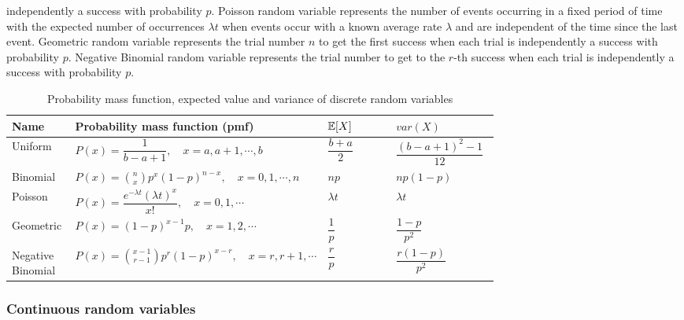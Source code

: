 independently a success with probability \(p\). Poisson random variable represents the number of events occurring in a fixed period of time with the expected number of occurrences \(\lambda t\) when events occur with a known average rate \(\lambda\) and are independent of the time since the last event. Geometric random variable represents the trial number \(n\) to get the first success when each trial is independently a success with probability \(p\). Negative Binomial random variable represents the trial number to get to the \(r\)-th success when each trial is independently a success with probability \(p\).

\begin{table}[H]
\centering
\small
\setlength{\tabcolsep}{3pt}
\begin{tabularx}{\linewidth}{|>{\raggedright\arraybackslash}p{0.13\linewidth}|>{\raggedright\arraybackslash}p{0.45\linewidth}|>{\centering\arraybackslash}p{0.14\linewidth}|>{\centering\arraybackslash}X|}
\hline
Name & Probability mass function (pmf) & \(\mathbb{E}[X]\) & \(\mathit{var}(X)\) \\
\hline
Uniform & \(P(x)=\dfrac{1}{b-a+1},\quad x=a,a+1,\cdots,b\) & \(\dfrac{b+a}{2}\) & \(\dfrac{(b-a+1)^2-1}{12}\) \\
\hline
Binomial & \(P(x)=\binom{n}{x}p^x(1-p)^{n-x},\quad x=0,1,\cdots,n\) & \(np\) & \(np(1-p)\) \\
\hline
Poisson & \(P(x)=\dfrac{e^{-\lambda t}(\lambda t)^x}{x!},\quad x=0,1,\cdots\)\footnotemark[20] & \(\lambda t\) & \(\lambda t\) \\
\hline
Geometric & \(P(x)=(1-p)^{x-1}p,\quad x=1,2,\cdots\) & \(\dfrac{1}{p}\) & \(\dfrac{1-p}{p^2}\) \\
\hline
Negative Binomial & \(P(x)=\binom{x-1}{r-1}p^r(1-p)^{x-r},\quad x=r,r+1,\cdots\) & \(\dfrac{r}{p}\) & \(\dfrac{r(1-p)}{p^2}\) \\
\hline
\end{tabularx}
\caption{Probability mass function, expected value and variance of discrete random variables}
\label{tab:zhou-table-4-2}
\end{table}

\subsubsection{Continuous random variables}

